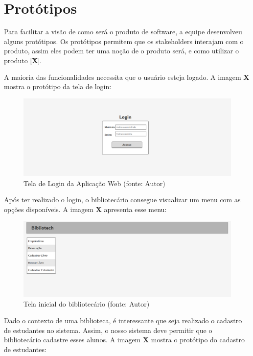 \chapter[Protótipos]{Protótipos}
Para facilitar a visão de como será o produto de software, a equipe desenvolveu alguns protótipos. Os protótipos permitem que os stakeholders interajam com o produto, assim eles podem ter uma noção de o produto será, e como utilizar o produto [\textbf{X}]. 

A maioria das funcionalidades necessita que o usuário esteja logado. A imagem \textbf{X} mostra o protótipo da tela de login: 

\begin{figure}[!h]
\centering
\includegraphics[scale=0.40, angle = 360]{figuras/prototipo1}
\caption[]{Tela de Login da Aplicação Web (fonte: Autor)}
\end{figure}
\FloatBarrier

Após ter realizado o login, o bibliotecário consegue visualizar um menu com as opções disponíveis. A imagem \textbf{X} apresenta esse menu:

\begin{figure}[!h]
\centering
\includegraphics[scale=0.40, angle = 360]{figuras/prototipo2}
\caption[]{Tela inicial do bibliotecário (fonte: Autor)}
\end{figure}
\FloatBarrier

Dado o contexto de uma biblioteca, é interessante que seja realizado o cadastro de estudantes no sistema. Assim, o nosso sistema deve permitir que o bibliotecário cadastre esses alunos. A imagem \textbf{X} mostra o protótipo do cadastro de estudantes:

